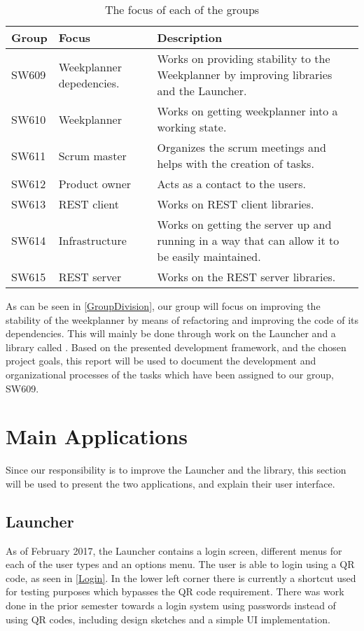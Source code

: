 \begin{table}[H]
\centering
\begin{tabular}{|p{2cm}|p{3cm}|p{8cm}|}
\hline
Group & Focus & Description \\ \hline
SW609 & Weekplanner depedencies. & Works on providing
stability to the Weekplanner by improving libraries and the Launcher.\\\hline 
SW610 & Weekplanner & Works on getting weekplanner into a working
state.\\\hline 
SW611 & Scrum master & Organizes the scrum meetings and helps with the creation of tasks. \\\hline 
SW612 & Product owner &  Acts as a contact to the users.\\\hline 
SW613 & REST client & Works on REST client libraries.\\ \hline

SW614 & Infrastructure & Works on getting the server up and running in a way
that can allow it to be easily maintained. \\\hline

SW615 & REST server & Works on the REST server libraries.\\ \hline

\end{tabular}
\caption{The focus of each of the groups}
\label{GroupDivision}
\end{table}

As can be seen in \autoref{GroupDivision}, our group will focus on improving the
stability of the weekplanner by means of refactoring and improving the code of
its dependencies. This will mainly be done through work on the Launcher and a
library called . Based on the presented development
framework, and the chosen project goals, this report will be used to document
the development and organizational processes of the tasks which have been
assigned to our group, SW609.

\section{Main Applications}
Since our responsibility is to improve the Launcher and the
 library, this section will be used to present the
two applications, and explain their user interface.

\subsection{Launcher}\label{LauncherReview}
As of February 2017, the Launcher contains a login screen, different menus for
each of the user types and an options menu. The user is able to login using a QR
code, as seen in \autoref{Login}. In the lower left corner there is
currently a shortcut used for testing purposes which bypasses the QR code
requirement. There was work done in the prior semester towards a login system
using passwords instead of using QR codes, including design sketches and a
simple UI implementation.

